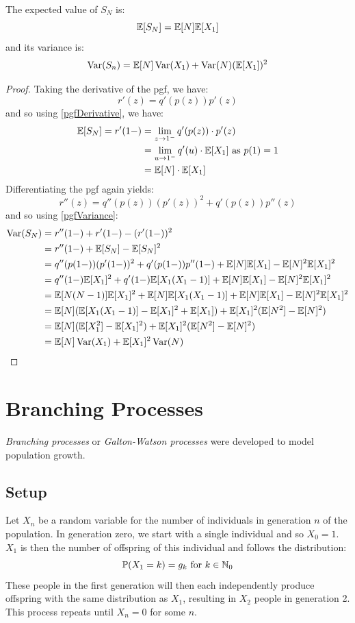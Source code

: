 \documentclass[../main.tex]{subfiles}
\begin{document}
\begin{corollary}
  The expected value of $S_N$ is:
  \[
    \mathbb{E}[S_N] = \mathbb{E}[N] \mathbb{E}[X_1]
  \]
  and its variance is:
  \[
    \operatorname{Var}(S_n) = \mathbb{E}[N] \operatorname{Var}(X_1) + \operatorname{Var}(N) (\mathbb{E}[X_1])^2
  \]
\end{corollary}
\begin{proof}
  Taking the derivative of the pgf, we have:
  \[
    r'(z) = q'(p(z)) p'(z)
  \]
  and so using \cref{pgfDerivative}, we have:
  \begin{align*}
    \mathbb{E}[S_N] = r'(1-) &= \lim_{z \to 1^{-}} q'(p(z)) \cdot p'(z) \\
                     &= \lim_{u \to 1^{-}} q'(u) \cdot \mathbb{E}[X_1] \text{ as $p(1) = 1$} \\
                     &= \mathbb{E}[N] \cdot \mathbb{E}[X_1]
  \end{align*}
  Differentiating the pgf again yields:
  \[
    r''(z) = q''(p(z)) (p'(z))^2 + q'(p(z)) p''(z)
  \]
  and so using \cref{pgfVariance}:
  \begin{align*}
    \operatorname{Var}(S_N) &= r''(1-) + r'(1-) - (r'(1-))^2 \\
              &= r''(1-) + \mathbb{E}[S_N] - \mathbb{E}[S_N]^2 \\
              &= q''(p(1-)) (p'(1-))^2 + q'(p(1-)) p''(1-) + \mathbb{E}[N]\mathbb{E}[X_1] - \mathbb{E}[N]^2\mathbb{E}[X_1]^2 \\
              &= q''(1-) \mathbb{E}[X_1]^2 + q'(1-) \mathbb{E}[X_1(X_1 - 1)] + \mathbb{E}[N]\mathbb{E}[X_1] - \mathbb{E}[N]^2\mathbb{E}[X_1]^2 \\
              &= \mathbb{E}[N(N - 1)] \mathbb{E}[X_1]^2 + \mathbb{E}[N] \mathbb{E}[X_1(X_1 - 1)] + \mathbb{E}[N]\mathbb{E}[X_1] - \mathbb{E}[N]^2\mathbb{E}[X_1]^2 \\
              &= \mathbb{E}[N](\mathbb{E}[X_1(X_1 - 1)] - \mathbb{E}[X_1]^2 + \mathbb{E}[X_1]) + \mathbb{E}[X_1]^2(\mathbb{E}[N^2] - \mathbb{E}[N]^2) \\
              &= \mathbb{E}[N](\mathbb{E}[X^2_1] - \mathbb{E}[X_1]^2) + \mathbb{E}[X_1]^2(\mathbb{E}[N^2] - \mathbb{E}[N]^2) \\
              &= \mathbb{E}[N]\operatorname{Var}(X_1) + \mathbb{E}[X_1]^2\operatorname{Var}(N)
  \end{align*}
\end{proof}
\section{Branching Processes}
\textit{Branching processes} or \textit{Galton-Watson processes} were developed to model population growth.
\subsection{Setup}
Let $X_n$ be a random variable for the number of individuals in generation $n$ of the population.
In generation zero, we start with a single individual and so $X_0 = 1$.
$X_1$ is then the number of offspring of this individual and follows the distribution:
\[
  \mathbb{P}(X_1 = k) = g_k \text{ for }k \in \mathbb{N}_0
\]
These people in the first generation will then each independently produce offspring with the same distribution as $X_1$, resulting in $X_2$ people in generation 2.
This process repeats until $X_n = 0$ for some $n$.
\end{document}
